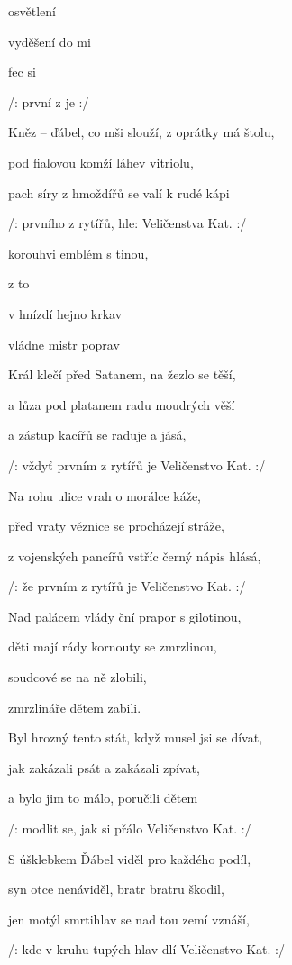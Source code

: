 

			

\zs
{} osvětlení  

 vyděšení  do mi

fec  si 

/:  první z  je   :/
\ks

\zs
Kněz -- ďábel, co mši slouží, z oprátky má štolu,

pod fialovou komží láhev vitriolu,

pach síry z hmoždířů se valí k rudé kápi

/: prvního z rytířů, hle: Veličenstva Kat. :/
\ks

\zr
{} korouhvi   emblém s tinou,

z    to 

v  hnízdí hejno krkav

 vládne mistr poprav
\kr

\zs
Král klečí před Satanem, na žezlo se těší,

a lůza pod platanem radu moudrých věší

a zástup kacířů se raduje a jásá,

/: vždyť prvním z rytířů je Veličenstvo Kat. :/
\ks

\zs
Na rohu ulice vrah o morálce káže,

před vraty věznice se procházejí stráže,

z vojenských pancířů vstříc černý nápis hlásá,

/: že prvním z rytířů je Veličenstvo Kat. :/
\ks

\zr
Nad palácem vlády ční prapor s gilotinou,

děti mají rády kornouty se zmrzlinou,

soudcové se na ně zlobili,

zmrzlináře dětem zabili.
\kr

\zs
Byl hrozný tento stát, když musel jsi se dívat,

jak zakázali psát a zakázali zpívat,

a bylo jim to málo, poručili dětem

/: modlit se, jak si přálo Veličenstvo Kat. :/
\ks

\zs
S úšklebkem Ďábel viděl pro každého podíl,

syn otce nenáviděl, bratr bratru škodil,

jen motýl smrtihlav se nad tou zemí vznáší,

/: kde v kruhu tupých hlav dlí Veličenstvo Kat. :/
\ks

\kp






